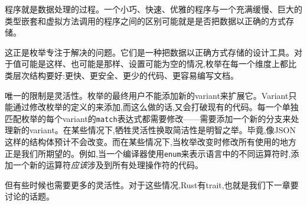 程序就是数据处理的过程。一个小巧、快速、优雅的程序与一个充满缓慢、巨大的类型嵌套和虚拟方法调用的程序之间的区别可能就是是否把数据以正确的方式存储。

这正是枚举专注于解决的问题。它们是一种把数据以正确方式存储的设计工具。对于值可能是这样、也可能是那样、设置可能为空的情况,枚举在每一个维度上都比类层次结构要好:更快、更安全、更少的代码、更容易编写文档。

唯一的限制是灵活性。枚举的最终用户不能添加新的variant来扩展它。Variant只能通过修改枚举的定义的来添加,而这么做的话,又会打破现有的代码。每一个单独匹配枚举的每个variant的\texttt{match}表达式都需要修改——需要添加一个新的分支来处理新的variant。在某些情况下,牺牲灵活性换取简洁性是明智之举。毕竟,像JSON这样的结构体预计不会改变。而在某些情况下,当枚举改变时修改所有使用的地方正是我们所期望的。例如,当一个编译器使用\texttt{enum}来表示语言中的不同运算符时,添加一个新的运算符\emph{应该}涉及到所有处理操作符的代码。

但有些时候也需要更多的灵活性。对于这些情况,Rust有trait,也就是我们下一章要讨论的话题。
